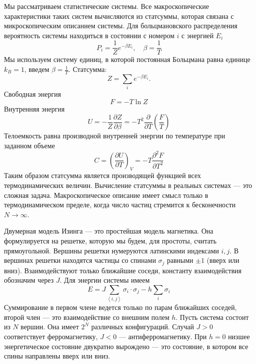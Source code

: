 \documentclass[a4paper,12pt]{article}
\theoremstyle{definition}
\theoremstyle{definition}
\theoremstyle{definition}
\begin{document}
Мы рассматриваем статистические системы. Все макроскопические характеристики таких систем вычисляются из статсуммы, которая связана с микроскопическим описанием системы. Для больцмановского распределения вероятность системы находиться в состоянии с номером $i$ с энергией $E_i$
\begin{equation}
  \label{eq:2}
  P_i=\frac{1}{Z}e^{-\beta E_i}, \quad \beta=\frac{1}{T}
\end{equation}
Мы используем систему единиц, в которой постоянная Больцмана равна единице $k_B=1$, введем $\beta=\frac{1}{T}$. Статсумма:
\begin{equation}
  \label{eq:3}
  Z=\sum_i e^{-\beta E_i}.
\end{equation}
Свободная энергия
\begin{equation}
  \label{eq:4}
  F=-T\ln Z
\end{equation}
Внутренняя энергия
\begin{equation}
  \label{eq:5}
  U=-\frac{1}{Z}\frac{\partial Z}{\partial \beta}=-T^2 \frac{\partial}{\partial T}\left(\frac{F}{T}\right)
\end{equation}
Телоемкость равна производной внутренней энергии по температуре при заданном объеме
\begin{equation}
  \label{eq:6}
  C=\left(\frac{\partial U}{\partial T}\right)_V=-T\frac{\partial^2 F}{\partial T^2}
\end{equation}
Таким образом статсумма является производящей функцией всех термодинамических величин. Вычисление статсуммы в реальных системах --- это сложная задача.
Макроскопическое описание имеет смысл только в термодинамическом пределе, когда число частиц стремится к бесконечности $N\to \infty$.

Двумерная модель Изинга --- это простейшая модель магнетика. Она формулируется на решетке, которую мы будем, для простоты, считать прямоугольной. Вершины решетки нумеруются латинскими индексами $i,j$. В вершинах решетки находятся частицы со спинами $\sigma_j$ равными $\pm 1$ (вверх или вниз). Взаимодействуют только ближайшие соседи, константу взаимодействия обозначим через $J$. Для энергии системы имеем
\begin{equation}
  \label{eq:1}
  E=J\sum_{\left<i,j\right>} \sigma_i\cdot \sigma_j-h\sum_i \sigma_i
\end{equation}
Суммирование в первом члене ведется только по парам ближайших соседей, второй член --- это взаимодействие со внешним полем $h$.
Пусть система состоит из $N$ вершин. Она имеет $2^N$ различных конфигураций. Случай $J>0$ соответствует ферромагнетику, $J<0$ --- антиферромагнетику. 
При $h=0$ низшее энергетическое состояние двукратно вырождено --- это состояние, в котором все спины направлены вверх или вниз. 
\end{document}
